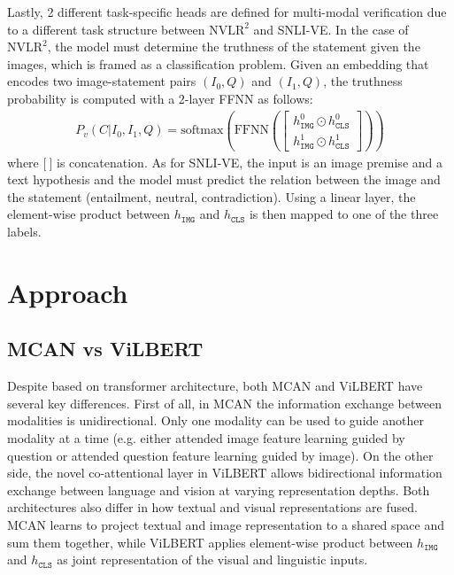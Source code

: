 \documentclass{article}
\begin{document}
Lastly, 2 different task-specific heads are defined for multi-modal verification due to a different task structure between $\text{NVLR}^2$ and SNLI-VE. In the case of $\text{NVLR}^{2}$, the model must determine the truthness of the statement given the images, which is framed as a classification problem. Given an embedding that encodes two image-statement pairs $(I_{0}, Q)$ and $(I_{1}, Q)$, the truthness probability is computed with a 2-layer FFNN as follows:
\begin{align}
    P_{v}(C|I_{0}, I_{1}, Q) = \text{softmax}\left(\text{FFNN}\left(\begin{bmatrix} 
    h_{\mathtt{IMG}}^{0} \odot h_{\mathtt{CLS}}^{0} \\
    h_{\mathtt{IMG}}^{1} \odot h_{\mathtt{CLS}}^{1}
    \end{bmatrix}\right)\right)
\end{align}
where $\mathbb{[}\: \mathbb{]}$ is concatenation. As for SNLI-VE, the input is an image premise and a text hypothesis and the model must predict the relation between the image and the statement (entailment, neutral, contradiction). Using a linear layer, the element-wise product between $h_{\mathtt{IMG}}$ and $h_{\mathtt{CLS}}$ is then mapped to one of the three labels.



\section{Approach}
\subsection{MCAN vs ViLBERT}
Despite based on transformer architecture, both MCAN and ViLBERT have several key differences. First of all, in MCAN the information exchange between modalities is unidirectional. Only one modality can be used to guide another modality at a time (e.g. either attended image feature learning guided by question or attended question feature learning guided by image). On the other side, the novel co-attentional layer in ViLBERT allows bidirectional information exchange between language and vision at varying representation depths. Both architectures also differ in how textual and visual representations are fused. MCAN learns to project textual and image representation to a shared space and sum them together, while ViLBERT applies element-wise product between $h_{\mathtt{IMG}}$ and $h_{\mathtt{CLS}}$ as joint representation of the visual and linguistic inputs. 
\end{document}

